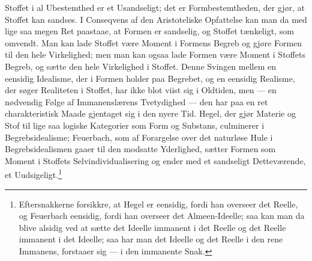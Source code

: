 \documentclass[12pt,a4paper]{book}
\begin{document}
Stoffet i al Ubestemthed er et Usandseligt; det er Formbestemtheden, der gjør,
at Stoffet kan sandses. I Conseqvens af den Aristoteliske Opfattelse kan man
da med lige saa megen Ret paastaae, at Formen er sandselig, og Stoffet
tænkeligt, som omvendt. Man kan lade Stoffet være Moment i Formens Begreb og
gjøre Formen til den hele Virkelighed; men man kan ogsaa lade Formen være
Moment i Stoffets Begreb, og sætte den hele Virkelighed i Stoffet. Denne
Svingen mellem en eensidig Idealisme, der i Formen holder paa Begrebet, og en
eensidig Realisme, der søger Realiteten i Stoffet, har ikke blot viist sig i
Oldtiden, men --- en nødvendig Følge af Immanenslærens Tvetydighed --- den har
paa en ret charakteristisk Maade gjentaget sig i den nyere Tid. Hegel, der
gjør Materie og Stof til lige saa logiske Kategorier som Form og Substans,
culminerer i Begrebsidealisme; Feuerbach, som af Forargelse over det naturløse
Hule i Begrebsidealismen gaaer til den modsatte Yderlighed, sætter Formen som
Moment i Stoffets Selvindividualisering og ender med et sandseligt
Detteværende, et Uudsigeligt.\footnote{%
Eftersnakkerne forsikkre, at Hegel er eensidig, fordi han overseer det Reelle,
og Feuerbach eensidig, fordi han overseer det Almeen-Ideelle; saa kan man da
blive alsidig ved at sætte det Ideelle immanent i det Reelle og det Reelle
immanent i det Ideelle; saa har man det Ideelle og det Reelle i den rene
Immanens, forstaaer sig --- i den immanente Snak.}
\end{document}
